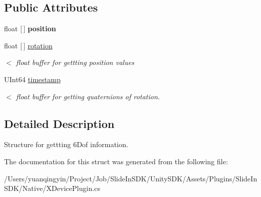 \subsection*{Public Attributes}
\begin{DoxyCompactItemize}
\item 
\mbox{\label{struct_ximmerse_1_1_input_system_1_1_x_device_plugin_1_1_x_attr6_dof_info_a633ef716a76daef2ac991553bf26e017}} 
float \mbox{[}$\,$\mbox{]} {\bfseries position}
\item 
\mbox{\label{struct_ximmerse_1_1_input_system_1_1_x_device_plugin_1_1_x_attr6_dof_info_a3d361a8a8a5a16812d7b766573d50e45}} 
float \mbox{[}$\,$\mbox{]} \mbox{\hyperlink{struct_ximmerse_1_1_input_system_1_1_x_device_plugin_1_1_x_attr6_dof_info_a3d361a8a8a5a16812d7b766573d50e45}{rotation}}
\begin{DoxyCompactList}\small\item\em $<$ float buffer for gettting position values \end{DoxyCompactList}\item 
\mbox{\label{struct_ximmerse_1_1_input_system_1_1_x_device_plugin_1_1_x_attr6_dof_info_ac2f72ee892f162752fbb90b70f330099}} 
U\+Int64 \mbox{\hyperlink{struct_ximmerse_1_1_input_system_1_1_x_device_plugin_1_1_x_attr6_dof_info_ac2f72ee892f162752fbb90b70f330099}{timestamp}}
\begin{DoxyCompactList}\small\item\em $<$ float buffer for getting quaternions of rotation. \end{DoxyCompactList}\end{DoxyCompactItemize}


\subsection{Detailed Description}
Structure for gettting 6\+Dof information. 

The documentation for this struct was generated from the following file\+:\begin{DoxyCompactItemize}
\item 
/\+Users/yuanqingyin/\+Project/\+Job/\+Slide\+In\+S\+D\+K/\+Unity\+S\+D\+K/\+Assets/\+Plugins/\+Slide\+In\+S\+D\+K/\+Native/X\+Device\+Plugin.\+cs\end{DoxyCompactItemize}
